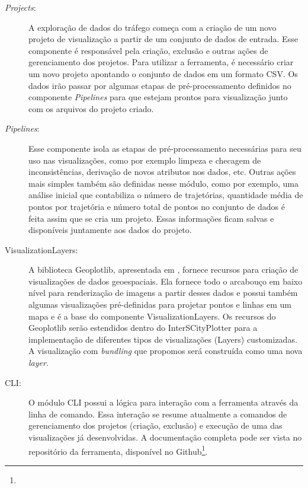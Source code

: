 \begin{description}
  \item[\emph{Projects}:] A exploração de dados do tráfego começa com a criação de um
novo projeto de visualização a partir de um conjunto de dados de entrada. Esse
componente é responsável pela criação, exclusão e outras ações de gerenciamento
dos projetos. Para utilizar a ferramenta, é necessário criar um novo projeto
apontando o conjunto de dados em um formato CSV. Os dados irão passar por algumas
etapas de pré-processamento definidos no componente \emph{Pipelines} para que
estejam prontos para visualização junto com os arquivos do projeto criado.

  \item[\emph{Pipelines}:] Esse componente isola as
etapas de pré-processamento necessárias para seu uso nas visualizações, como
por exemplo limpeza e checagem de inconsistências, derivação de novos
atributos nos dados, etc. Outras ações mais simples também são definidas nesse módulo,
como por exemplo, uma análise inicial que contabiliza o número de trajetórias,
quantidade média de pontos por trajetória e número total de pontos no conjunto
de dados é feita assim que se cria um projeto. Essas informações ficam salvas
e disponíveis juntamente aos dados do projeto.

  \item[VisualizationLayers:] A biblioteca Geoplotlib, apresentada em
\citet{Andrea2016}, fornece recursos para criação de visualizações de dados
geoespaciais. Ela fornece todo o arcabouço em baixo nível para renderização de
imagens a partir desses dados e possui também algumas visualizações
pré-definidas para projetar pontos e linhas em um mapa e é a base do componente
VisualizationLayers. Os recursos do Geoplotlib serão estendidos dentro do
InterSCityPlotter para a implementação de diferentes tipos de visualizações
(Layers) customizadas. A visualização com \emph{bundling} que propomos será
construída como uma nova \emph{layer}.

  \item[CLI:] O módulo CLI possui a lógica para interação com a ferramenta
através da linha de comando. Essa interação se resume atualmente a comandos de
gerenciamento dos projetos (criação, exclusão) e execução de uma das
visualizações já desenvolvidas. A documentação completa pode ser vista no
repositório da ferramenta, disponível no
Github\footnote{}.

\end{description}

